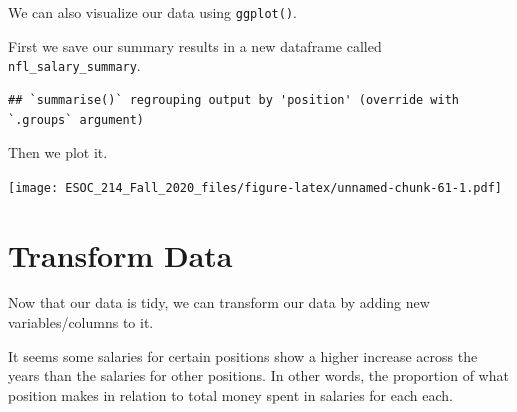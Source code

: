 \documentclass[
]{book}
\newenvironment{Shaded}{\begin{snugshade}}{\end{snugshade}}
\newcommand{\DataTypeTok}[1]{\textcolor[rgb]{0.13,0.29,0.53}{#1}}
\newcommand{\KeywordTok}[1]{\textcolor[rgb]{0.13,0.29,0.53}{\textbf{#1}}}
\newcommand{\NormalTok}[1]{#1}
\newcommand{\OperatorTok}[1]{\textcolor[rgb]{0.81,0.36,0.00}{\textbf{#1}}}
\newcommand{\StringTok}[1]{\textcolor[rgb]{0.31,0.60,0.02}{#1}}
\begin{document}
We can also visualize our data using \texttt{ggplot()}.

First we save our summary results in a new dataframe called \texttt{nfl\_salary\_summary}.

\begin{Shaded}
\end{Shaded}

\begin{verbatim}
## `summarise()` regrouping output by 'position' (override with `.groups` argument)
\end{verbatim}

Then we plot it.

\begin{Shaded}
\end{Shaded}

\texttt{[image: ESOC\_214\_Fall\_2020\_files/figure-latex/unnamed-chunk-61-1.pdf]}

\hypertarget{transform-data}{%
\section{Transform Data}\label{transform-data}}

Now that our data is tidy, we can transform our data by adding new variables/columns to it.

It seems some salaries for certain positions show a higher increase across the years than the salaries for other positions. In other words, the proportion of what position makes in relation to total money spent in salaries for each each.
\end{document}
